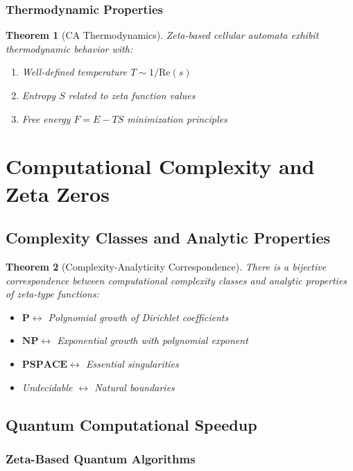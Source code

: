 \documentclass[12pt]{article}
\theoremstyle{plain}
\newtheorem{theorem}{Theorem}[section]
\theoremstyle{definition}
\newcommand{\Re}{\text{Re}}
\begin{document}
\subsubsection{Thermodynamic Properties}

\begin{theorem}[CA Thermodynamics]
Zeta-based cellular automata exhibit thermodynamic behavior with:
\begin{enumerate}
\item Well-defined temperature $T \sim 1/\Re(s)$
\item Entropy $S$ related to zeta function values
\item Free energy $F = E - TS$ minimization principles
\end{enumerate}
\end{theorem}

\section{Computational Complexity and Zeta Zeros}

\subsection{Complexity Classes and Analytic Properties}

\begin{theorem}[Complexity-Analyticity Correspondence]
There is a bijective correspondence between computational complexity classes and analytic properties of zeta-type functions:
\begin{itemize}
\item $\mathbf{P} \leftrightarrow$ Polynomial growth of Dirichlet coefficients
\item $\mathbf{NP} \leftrightarrow$ Exponential growth with polynomial exponent
\item $\mathbf{PSPACE} \leftrightarrow$ Essential singularities
\item Undecidable $\leftrightarrow$ Natural boundaries
\end{itemize}
\end{theorem}

\subsection{Quantum Computational Speedup}

\subsubsection{Zeta-Based Quantum Algorithms}
\end{document}
